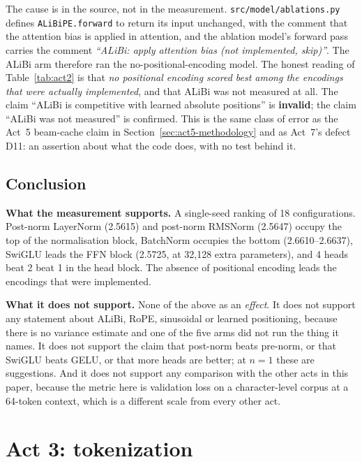 \documentclass[11pt,a4paper]{article}
\begin{document}
The cause is in the source, not in the measurement.
\texttt{src/model/ablations.py} defines \texttt{ALiBiPE.forward} to return its
input unchanged, with the comment that the attention bias is applied in
attention, and the ablation model's forward pass carries the comment
\emph{``ALiBi: apply attention bias (not implemented, skip)''}. The ALiBi arm
therefore ran the no-positional-encoding model. The honest reading of
Table~\ref{tab:act2} is that \emph{no positional encoding scored best among
the encodings that were actually implemented}, and that ALiBi was not measured
at all. The claim ``ALiBi is competitive with learned absolute positions'' is
\textbf{invalid}; the claim ``ALiBi was not measured'' is confirmed. %
 This is
the same class of error as the Act~5 beam-cache claim in
Section~\ref{sec:act5-methodology} and as Act~7's defect D11: an assertion
about what the code does, with no test behind it.

\subsection{Conclusion}
\label{sec:act2-conclusion}

\textbf{What the measurement supports.} A single-seed ranking of 18
configurations. Post-norm LayerNorm (2.5615) and post-norm RMSNorm (2.5647)
occupy the top of the normalisation block, BatchNorm occupies the bottom
(2.6610--2.6637), SwiGLU leads the FFN block (2.5725, at 32,128 extra
parameters), and 4 heads beat 2 beat 1 in the head block. The absence of
positional encoding leads the encodings that were implemented.

\textbf{What it does not support.} None of the above as an \emph{effect}. It
does not support any statement about ALiBi, RoPE, sinusoidal or learned
positioning, because there is no variance estimate and one of the five arms did
not run the thing it names. It does not support the claim that post-norm beats
pre-norm, or that SwiGLU beats GELU, or that more heads are better; at $n = 1$
these are suggestions. And it does not support any comparison with the other
acts in this paper, because the metric here is validation loss on a
character-level corpus at a 64-token context, which is a different scale from
every other act.

\section{Act 3: tokenization}
\label{sec:act3}
\end{document}
